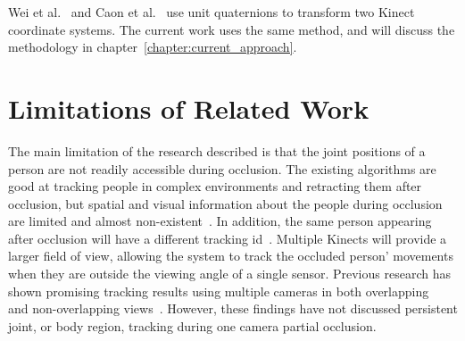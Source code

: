 Wei et al.~\cite{wei_kinect_calibration} and Caon et al.~\cite{caon_context_aware_gesture} use unit quaternions to transform two Kinect coordinate systems. The current work uses the same method, and will discuss the methodology in chapter~\ref{chapter:current_approach}.

\section{Limitations of Related Work}

The main limitation of the research described is that the joint positions of a person are not readily accessible during occlusion. The existing algorithms are good at tracking people in complex environments and retracting them after occlusion, but spatial and visual information about the people during occlusion are limited and almost non-existent~\cite{munaro_tracking_within_groups_with_mobile_robot}. In addition, the same person appearing after occlusion will have a different tracking id~\cite{liu_tracking_with_pei}. Multiple Kinects will provide a larger field of view, allowing the system to track the occluded person' movements when they are outside the viewing angle of a single sensor. Previous research has shown promising tracking results using multiple cameras in both overlapping ~\cite{zhang_multiple_depth_cameras, chu_multiple_cameras_transfer_functions, yildiz_multiple_cameras_constraints, yamashita_multiple_cameras_face_detection} and non-overlapping views~\cite{cai_intercamera_context_tracking, javed_tracking_disjoint}. However, these findings have not discussed persistent joint, or body region, tracking during one camera partial occlusion.


